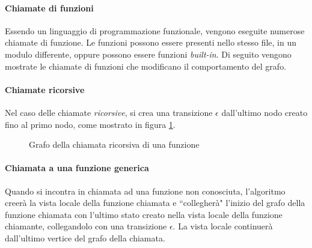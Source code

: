 \paragraph{Chiamate di funzioni}
Essendo un linguaggio di programmazione funzionale, vengono eseguite numerose chiamate di funzione. Le funzioni possono essere presenti nello stesso file, in un modulo differente, oppure possono essere funzioni \textit{built-in}. Di seguito vengono mostrate le chiamate di funzioni che modificano il comportamento del grafo.

\paragraph{Chiamate ricorsive}

Nel caso delle chiamate \textit{ricorsive}, si crea una transizione $\epsilon$ dall'ultimo nodo creato fino al primo nodo, come mostrato in figura \ref{grafo:ricors}.

\begin{figure}[ht!]
    \centering
    \caption{Grafo della chiamata ricorsiva di una funzione}
    \label{grafo:ricors}
\end{figure}

\paragraph{Chiamata a una funzione generica}
Quando si incontra in chiamata ad una funzione non conosciuta, l'algoritmo creer\`a la vista locale della funzione chiamata e ``collegher\`a" l'inizio del grafo della funzione chiamata con l'ultimo stato creato nella vista locale della funzione chiamante, collegandolo con una transizione $\epsilon$. La vista locale continuer\`a dall'ultimo vertice del grafo della chiamata.

\bigskip

